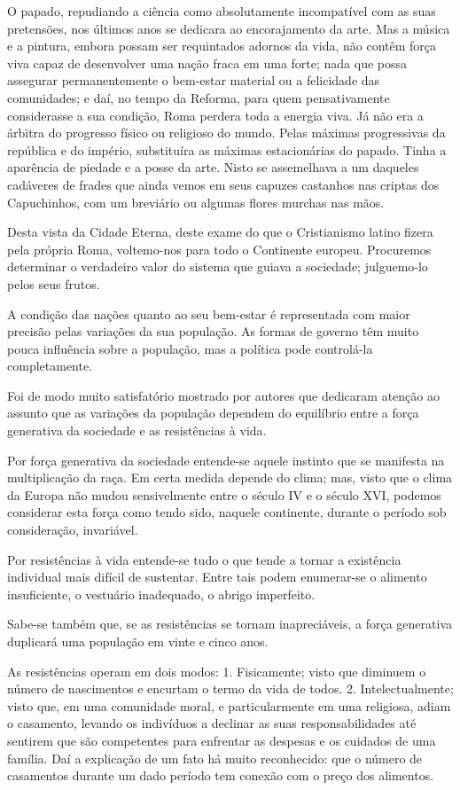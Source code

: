 \documentclass[11pt,a5paper,twoside,openany]{book}
\begin{document}
O papado, repudiando a ciência como absolutamente incompatível com as suas pretensões, nos últimos anos se dedicara ao encorajamento da arte. Mas a música e a pintura, embora possam ser requintados adornos da vida, não contêm força viva capaz de desenvolver uma nação fraca em uma forte; nada que possa assegurar permanentemente o bem-estar material ou a felicidade das comunidades; e daí, no tempo da Reforma, para quem pensativamente considerasse a sua condição, Roma perdera toda a energia viva. Já não era a árbitra do progresso físico ou religioso do mundo. Pelas máximas progressivas da república e do império, substituíra as máximas estacionárias do papado. Tinha a aparência de piedade e a posse da arte. Nisto se assemelhava a um daqueles cadáveres de frades que ainda vemos em seus capuzes castanhos nas criptas dos Capuchinhos, com um breviário ou algumas flores murchas nas mãos.

Desta vista da Cidade Eterna, deste exame do que o Cristianismo latino fizera pela própria Roma, voltemo-nos para todo o Continente europeu. Procuremos determinar o verdadeiro valor do sistema que guiava a sociedade; julguemo-lo pelos seus frutos.

A condição das nações quanto ao seu bem-estar é representada com maior precisão pelas variações da sua população. As formas de governo têm muito pouca influência sobre a população, mas a política pode controlá-la completamente.

Foi de modo muito satisfatório mostrado por autores que dedicaram atenção ao assunto que as variações da população dependem do equilíbrio entre a força generativa da sociedade e as resistências à vida.

Por força generativa da sociedade entende-se aquele instinto que se manifesta na multiplicação da raça. Em certa medida depende do clima; mas, visto que o clima da Europa não mudou sensivelmente entre o século IV e o século XVI, podemos considerar esta força como tendo sido, naquele continente, durante o período sob consideração, invariável.

Por resistências à vida entende-se tudo o que tende a tornar a existência individual mais difícil de sustentar. Entre tais podem enumerar-se o alimento insuficiente, o vestuário inadequado, o abrigo imperfeito.

Sabe-se também que, se as resistências se tornam inapreciáveis, a força generativa duplicará uma população em vinte e cinco anos.

As resistências operam em dois modos: 1. Fisicamente; visto que diminuem o número de nascimentos e encurtam o termo da vida de todos. 2. Intelectualmente; visto que, em uma comunidade moral, e particularmente em uma religiosa, adiam o casamento, levando os indivíduos a declinar as suas responsabilidades até sentirem que são competentes para enfrentar as despesas e os cuidados de uma família. Daí a explicação de um fato há muito reconhecido: que o número de casamentos durante um dado período tem conexão com o preço dos alimentos.
\end{document}
